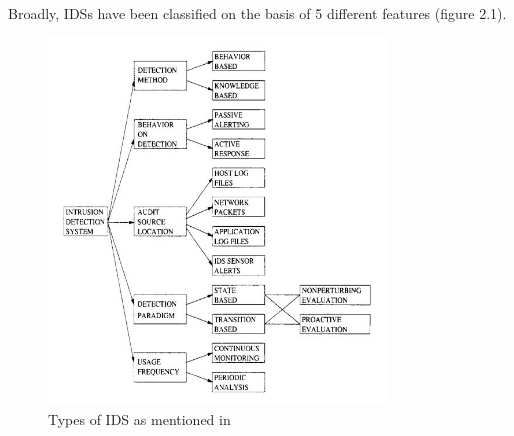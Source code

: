 \paragraph{}
Broadly, IDSs have been classified on the basis of 5 different features (figure 2.1).
\begin{figure}[h]
    \hfill\includegraphics[width=0.8\textwidth]{Chapter2/types_of_ids}\hspace*{\fill}
    \caption{Types of IDS as mentioned in \cite{ids_taxonomy}}
    \label{}
\end{figure}
